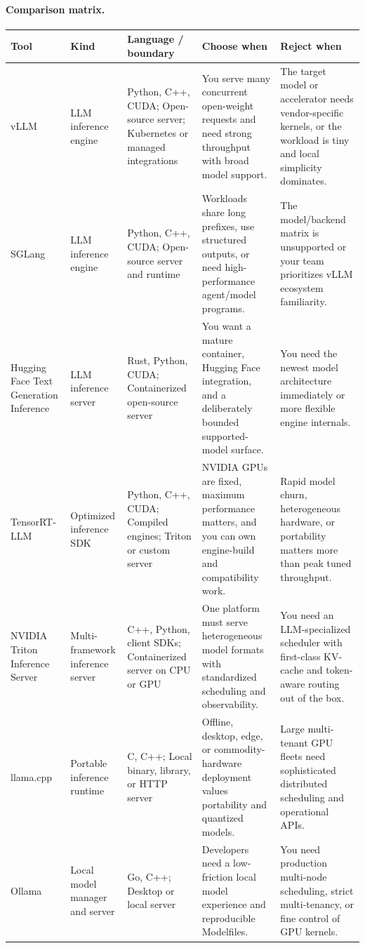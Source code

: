 \paragraph{Comparison matrix.}
\begin{longtable}{@{}p{20mm}p{22mm}p{26mm}p{46mm}p{46mm}@{}}
\toprule\textbf{Tool} & \textbf{Kind} & \textbf{Language / boundary} & \textbf{Choose when} & \textbf{Reject when}\\\midrule\endhead
vLLM & LLM inference engine & Python, C++, CUDA; Open-source server; Kubernetes or managed integrations & You serve many concurrent open-weight requests and need strong throughput with broad model support. & The target model or accelerator needs vendor-specific kernels, or the workload is tiny and local simplicity dominates.\\
SGLang & LLM inference engine & Python, C++, CUDA; Open-source server and runtime & Workloads share long prefixes, use structured outputs, or need high-performance agent/model programs. & The model/backend matrix is unsupported or your team prioritizes vLLM ecosystem familiarity.\\
Hugging Face Text Generation Inference & LLM inference server & Rust, Python, CUDA; Containerized open-source server & You want a mature container, Hugging Face integration, and a deliberately bounded supported-model surface. & You need the newest model architecture immediately or more flexible engine internals.\\
TensorRT-LLM & Optimized inference SDK & Python, C++, CUDA; Compiled engines; Triton or custom server & NVIDIA GPUs are fixed, maximum performance matters, and you can own engine-build and compatibility work. & Rapid model churn, heterogeneous hardware, or portability matters more than peak tuned throughput.\\
NVIDIA Triton Inference Server & Multi-framework inference server & C++, Python, client SDKs; Containerized server on CPU or GPU & One platform must serve heterogeneous model formats with standardized scheduling and observability. & You need an LLM-specialized scheduler with first-class KV-cache and token-aware routing out of the box.\\
llama.cpp & Portable inference runtime & C, C++; Local binary, library, or HTTP server & Offline, desktop, edge, or commodity-hardware deployment values portability and quantized models. & Large multi-tenant GPU fleets need sophisticated distributed scheduling and operational APIs.\\
Ollama & Local model manager and server & Go, C++; Desktop or local server & Developers need a low-friction local model experience and reproducible Modelfiles. & You need production multi-node scheduling, strict multi-tenancy, or fine control of GPU kernels.\\

\end{longtable}

